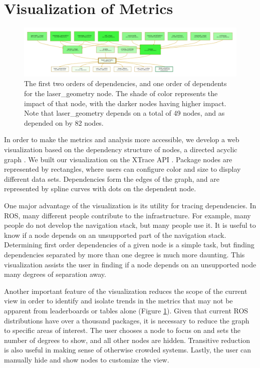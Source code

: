 \documentclass[letterpaper, 10 pt, conference]{ieeeconf}  %
\begin{document}
\section{Visualization of Metrics}

\begin{figure}[th!]
\centering
\includegraphics[width=2.0\columnwidth]{laser_geo}
\caption{The first two orders of dependencies, and one order of dependents for the laser\_geometry node. The shade of color represents the impact of that node, with the darker nodes having higher impact. Note that laser\_geometry depends on a total of 49 nodes, and as depended on by 82 nodes.}
\label{laser_geo_vis}
\end{figure}


In order to make the metrics and analysis more accessible, we develop a web visualization based on the dependency structure of nodes, a directed acyclic graph \cite{ros-komodo-vis}. We built our visualization on the XTrace API \cite{xtrace}. Package nodes are represented by rectangles, where users can configure color and size to display different data sets. Dependencies form the edges of the graph, and are represented by spline curves with dots on the dependent node.

One major advantage of the visualization is its utility for tracing dependencies. In ROS, many different people contribute to the infrastructure. For example, many people do not develop the navigation stack, but many people use it. It is useful to know if a node depends on an unsupported part of the navigation stack. Determining first order dependencies of a given node is a simple task, but finding dependencies separated by more than one degree is much more daunting. This visualization assists the user in finding if a node depends on an unsupported node many degrees of separation away.

Another important feature of the visualization reduces the scope of the current view in order to identify and isolate trends in the metrics that may not be apparent from leaderboards or tables alone (Figure \ref{laser_geo_vis}). Given that current ROS distributions have over a thousand packages, it is necessary to reduce the graph to specific areas of interest. The user chooses a node to focus on and sets the number of degrees to show, and all other nodes are hidden. Transitive reduction is also useful in making sense of otherwise crowded systems. Lastly, the user can manually hide and show nodes to customize the view.
\end{document}
